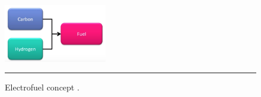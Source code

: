 \begin{figure}
	\centering
	\includegraphics[width=0.4\textwidth]{figures/electrofuels.png}
	\rule{0.4\textwidth}{0.5pt} %
	\caption{Electrofuel concept \citep{Electrofuels2016}.}
	\label{fig:electrofuels}
\end{figure}